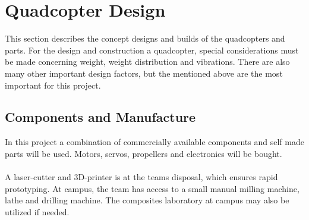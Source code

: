 \chapter{Quadcopter Design}
This section describes the concept designs and builds of the quadcopters and parts. For the design and construction a quadcopter, special considerations must be made concerning weight, weight distribution and vibrations. There are also many other important design factors, but the mentioned above are the most important for this project.  

\section{Components and Manufacture}
In this project a combination of commercially available components and self made parts will be used. Motors, servos, propellers and electronics will be bought.
\\\\
A laser-cutter and 3D-printer is at the teams disposal, which ensures rapid prototyping. At campus, the team has access to a small manual milling machine, lathe and drilling machine. The composites laboratory at campus may also be utilized if needed.

